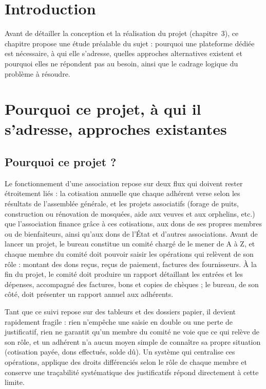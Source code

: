 
\section{Introduction}

Avant de détailler la conception et la réalisation du projet (chapitre~3), ce
chapitre propose une étude préalable du sujet : pourquoi une plateforme dédiée
est nécessaire, à qui elle s'adresse, quelles approches alternatives existent
et pourquoi elles ne répondent pas au besoin, ainsi que le cadrage logique du
problème à résoudre.

\section{Pourquoi ce projet, à qui il s'adresse, approches existantes}

\subsection{Pourquoi ce projet ?}

Le fonctionnement d'une association repose sur deux flux qui doivent rester
étroitement liés : la cotisation annuelle que chaque adhérent verse selon les
résultats de l'assemblée générale, et les projets associatifs (forage de
puits, construction ou rénovation de mosquées, aide aux veuves et aux
orphelins, etc.) que l'association finance grâce à ces cotisations, aux dons
de ses propres membres ou de bienfaiteurs, ainsi qu'aux dons de l'État et
d'autres associations. Avant de lancer un projet, le bureau constitue un
comité chargé de le mener de A à Z, et chaque membre du comité doit pouvoir
saisir les opérations qui relèvent de son rôle : montant des dons reçus,
reçus de paiement, factures des fournisseurs. À la fin du projet, le comité
doit produire un rapport détaillant les entrées et les dépenses, accompagné
des factures, bons et copies de chèques ; le bureau, de son côté, doit
présenter un rapport annuel aux adhérents.

Tant que ce suivi repose sur des tableurs et des dossiers papier, il devient
rapidement fragile : rien n'empêche une saisie en double ou une perte de
justificatif, rien ne garantit qu'un membre du comité ne voie que ce qui
relève de son rôle, et un adhérent n'a aucun moyen simple de connaître sa
propre situation (cotisation payée, dons effectués, solde dû). Un système
qui centralise ces opérations, applique des droits différenciés selon le rôle
de chaque membre et conserve une traçabilité systématique des justificatifs
répond directement à cette limite.

